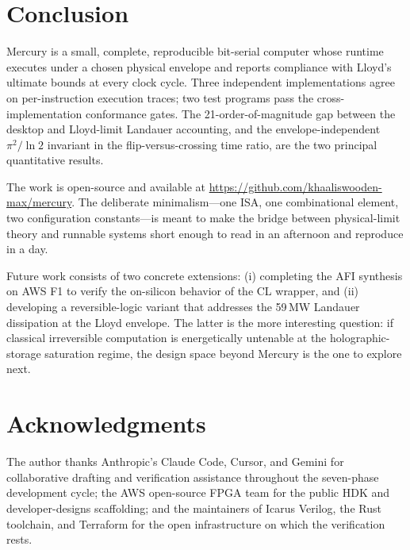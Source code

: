 \documentclass[conference,letterpaper,10pt]{IEEEtran}
\begin{document}
\section{Conclusion}

Mercury is a small, complete, reproducible bit-serial computer
whose runtime executes under a chosen physical envelope and
reports compliance with Lloyd's ultimate bounds at every
clock cycle. Three independent implementations agree on
per-instruction execution traces; two test programs pass the
cross-implementation conformance gates. The 21-order-of-magnitude
gap between the desktop and Lloyd-limit Landauer accounting,
and the envelope-independent $\pi^2/\ln 2$ invariant in the
flip-versus-crossing time ratio, are the two principal
quantitative results.

The work is open-source and available at
\url{https://github.com/khaaliswooden-max/mercury}. The
deliberate minimalism---one ISA, one combinational element, two
configuration constants---is meant to make the bridge between
physical-limit theory and runnable systems short enough to read
in an afternoon and reproduce in a day.

Future work consists of two concrete extensions: (i) completing
the AFI synthesis on AWS F1 to verify the on-silicon
behavior of the CL wrapper, and (ii) developing a reversible-logic
variant that addresses the 59\,MW Landauer dissipation at the
Lloyd envelope. The latter is the more interesting question: if
classical irreversible computation is energetically untenable at
the holographic-storage saturation regime, the design space
beyond Mercury is the one to explore next.

\section*{Acknowledgments}

The author thanks Anthropic's Claude Code, Cursor, and Gemini for
collaborative drafting and verification assistance throughout the
seven-phase development cycle; the AWS open-source FPGA team for
the public HDK and developer-designs scaffolding; and the
maintainers of Icarus Verilog, the Rust toolchain, and Terraform
for the open infrastructure on which the verification rests.
\end{document}

